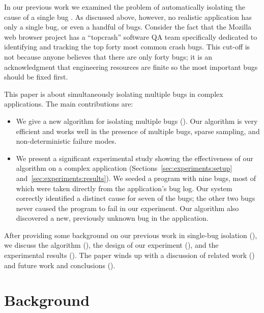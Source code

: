 \documentclass[draft]{sig-alternate}
\begin{document}
In our previous work we examined the problem of automatically
isolating the cause of a single bug
\cite{PLDI`03*141,Zheng:2003:SDSP}.  As discussed above, however, no
realistic application has only a single bug, or even a handful of
bugs.  Consider the fact that the Mozilla web browser project has a
``topcrash'' software QA team specifically dedicated to identifying
and tracking the top forty most common crash bugs.  This cut-off is
not because anyone believes that there are only forty bugs; it is an
acknowledgment that engineering resources are finite so the most
important bugs should be fixed first.

This paper is about simultaneously isolating multiple bugs in complex
applications.  The main contributions are:

\begin{itemize}

\item We give a new algorithm for isolating multiple bugs
().  Our algorithm is very efficient and works well in the
presence of multiple bugs, sparse sampling, and non-deterministic failure
modes.

\item We present a significant experimental study showing the
effectiveness of our algorithm on a complex application
(Sections~\ref{sec:experiments:setup}
and~\ref{sec:experiments:results}).  We seeded a program with nine
bugs, most
of which were taken directly from the application's bug log.  Our
system correctly identified a distinct cause for seven of the bugs; the
other two bugs never caused the program to fail in our experiment.
Our algorithm also discovered a new, previously unknown bug in the
application.

\end{itemize}

After providing some background on our previous work in single-bug
isolation (), we discuss the algorithm (),
the design of our experiment (), and
the experimental results ().
The paper winds up with a discussion of related work ()
and future work and conclusions ().

\section{Background}
\label{sec:background}
\end{document}
